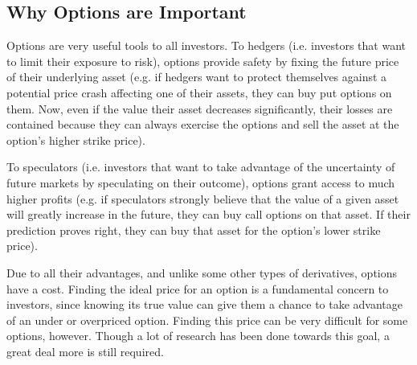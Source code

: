 \subsection{Why Options are Important}
\label{subsection:why options are important}
Options are very useful tools to all investors. 
To hedgers (i.e. investors that want to limit their exposure to risk), options provide safety by fixing the future price of their underlying asset (e.g. if hedgers want to protect themselves against a potential price crash affecting one of their assets, they can buy put options on them. Now, even if the value their asset decreases significantly, their losses are contained because they can always exercise the options and sell the asset at the option's higher strike price).

To speculators (i.e. investors that want to take advantage of the uncertainty of future markets by speculating on their outcome), options grant access to much higher profits (e.g. if speculators strongly believe that the value of a given asset will greatly increase in the future, they can buy call options on that asset. If their prediction proves right, they can buy that asset for the option's lower strike price).

Due to all their advantages, and unlike some other types of derivatives, options have a cost. Finding the ideal price for an option is a fundamental concern to investors, since knowing its true value can give them a chance to take advantage of an under or overpriced option.
Finding this price can be very difficult for some options, however. Though a lot of research has been done towards this goal, a great deal more is still required.

